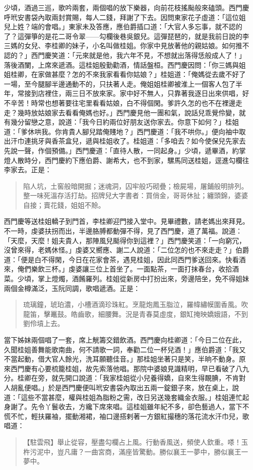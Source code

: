 少頃，酒過三巡，歌吟兩套，兩個唱的放下樂器，向前花枝搖颭般來磕頭。西門慶呼玳安書袋內取兩封賞賜，每人二錢，拜謝了下去。因問東家花子虛道：「這位姐兒上姓？端的會唱。」東家未及答應，應伯爵插口道：「大官人多忘事，就不認的了？這彈箏的是花二哥令翠——勾欄後巷吳銀兒。這彈琵琶的，就是我前日說的李三媽的女兒、李桂卿的妹子，小名叫做桂姐。你家中見放著他的親姑娘。如何推不認的？」西門慶笑道：「元來就是他，我六年不見，不想就出落得恁般成人了！」落後酒闌，上席來遞酒。這桂姐殷勤勸酒，情話盤桓。西門慶因問：「你三媽與姐姐桂卿，在家做甚麼？怎的不來我家看看你姑娘？」桂姐道：「俺媽從去歲不好了一場，至今腿腳半邊通動不的，只扶著人走。俺姐姐桂卿被淮上一個客人包了半年，常接到店裡住，兩三日不放來家。家中好不無人，只靠著我逐日出來供唱，好不辛苦！時常也想著要往宅里看看姑娘，白不得個閑。爹許久怎的也不在裡邊走走？幾時放姑娘家去看看俺媽也好。」西門慶見他一團和氣，說話兒乖覺伶變，就有幾分留戀之意，說道：「我今日約兩位好朋友送你家去。你意下如何？」桂姐道：「爹休哄我。你肯貴人腳兒踏俺賤地？」西門慶道：「我不哄你。」便向袖中取出汗巾連挑牙與香茶盒兒，遞與桂姐收了。桂姐道：「多咱去？如今使保兒先家去先說一聲，作個預備。」西門慶道：「直待人散，一同起身。」少頃，遞畢酒，約掌燈人散時分，西門慶約下應伯爵、謝希大，也不到家，騾馬同送桂姐，逕進勾欄往李家去。正是：
\begin{quote}
陷人坑，土窖般暗開掘；迷魂洞，囚牢般巧砌疊；檢屍場，屠鋪般明排列。整一味死溫存活打劫。招牌兒大字書者：買俏金，哥哥休扯；纏頭錦，婆婆自接；賣花錢，姐姐不賒。
\end{quote}

西門慶等送桂姐轎子到門首，李桂卿迎門接入堂中。見畢禮數，請老媽出來拜見。不一時，虔婆扶拐而出，半邊胳膊都動彈不得，見了西門慶，道了萬福。說道：「天麼，天麼！姐夫貴人，那陣風兒颳得你到這裡？」西門慶笑道：「一向窮冗，沒曾來得，老媽休怪。」虔婆又嚮應、謝二人說道：「二位怎的也不來走走？」伯爵道：「便是白不得閑，今日在花家會茶，遇見桂姐，因此同西門爹送回來。快看酒來，俺們樂飲三杯。」虔婆讓三位上首坐了。一面點茶，一面打抹春台，收拾酒菜。少頃，掌上燈燭，酒餚羅列。桂姐從新房中打扮出來，旁邊陪坐，免不得姐妹兩個金樽滿泛，玉阮同調，歌唱遞酒。正是：
\begin{quote}
琉璃鐘，琥珀濃，小槽酒滴珍珠紅。烹龍炮鳳玉脂泣，羅幃繡幙圍香風。吹龍笛，擊鼉鼓。皓齒歌，細腰舞。況是青春莫虛度，銀缸掩映嬌娥語，不到劉伶墳上去。
\end{quote}

當下姊妹兩個唱了一套，席上觥籌交錯飲酒。西門慶向桂卿道：「今日二位在此，久聞桂姐善舞能歌南曲，何不請歌一詞，奉勸二位一杯兒酒！」應伯爵道：「我又不當起動，借大官人餘光，洗耳願聽佳音。」那桂姐坐著只是笑，半晌不動身。原來西門慶有心要梳籠桂姐，故先索落他唱。那院中婆娘見識精明，早已看破了八九分。桂卿在旁，就先開口說道：「我家桂姐從小兒養得嬌，自來生得靦腆，不肯對人胡亂便唱。」於是西門慶便叫玳安書袋內取出五兩一錠銀子來，放在桌上，說道：「這些不當甚麼，權與桂姐為脂粉之需，改日另送幾套織金衣服。」桂姐連忙起身謝了。先令丫鬟收去，方纔下席來唱。這桂姐雖年紀不多，卻色藝過人，當下不慌不忙，輕扶羅袖，擺動湘裙，袖口邊搭剌著一方銀紅撮穗的落花流水汗巾兒，歌唱道：
\begin{quote}
【駐雲飛】舉止從容，壓盡勾欄占上風。行動香風送，頻使人欽重。嗏！玉杵污泥中，豈凡庸？一曲宮商，滿座皆驚動。勝似襄王一夢中，勝似襄王一夢中。
\end{quote}

